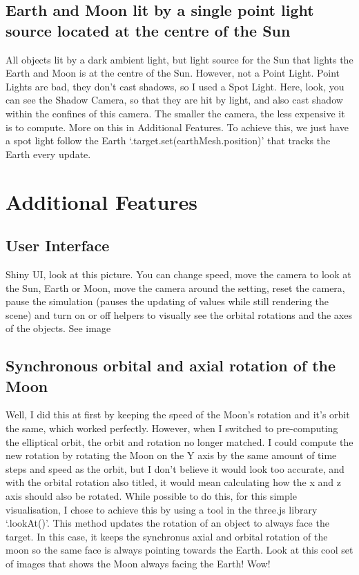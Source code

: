 \documentclass[12pt]{article}
\begin{document}
\subsection{Earth and Moon lit by a single point light source located at the centre of the Sun}
All objects lit by a dark ambient light, but light source for the Sun that lights the Earth and Moon is at the centre of the Sun. However, not a Point Light. Point Lights are bad, they don't cast shadows, so I used a Spot Light. Here, look, you can see the Shadow Camera, so that they are hit by light, and also cast shadow within the confines of this camera. The smaller the camera, the less expensive it is to compute. More on this in Additional Features. To achieve this, we just have a spot light follow the Earth `.target.set(earthMesh.position)' that tracks the Earth every update.



\section{Additional Features}
\subsection{User Interface}
Shiny UI, look at this picture. You can change speed, move the camera to look at the Sun, Earth or Moon, move the camera around the setting, reset the camera, pause the simulation (pauses the updating of values while still rendering the scene) and turn on or off helpers to visually see the orbital rotations and the axes of the objects. See image

\subsection{Synchronous orbital and axial rotation of the Moon}
Well, I did this at first by keeping the speed of the Moon's rotation and it's orbit the same, which worked perfectly. However, when I switched to pre-computing the elliptical orbit, the orbit and rotation no longer matched. I could compute the new rotation by rotating the Moon on the Y axis by the same amount of time steps and speed as the orbit, but I don't believe it would look too accurate, and with the orbital rotation also titled, it would mean calculating how the x and z axis should also be rotated. While possible to do this, for this simple visualisation, I chose to achieve this by using a tool in the three.js library `.lookAt()'. This method updates the rotation of an object to always face the target. In this case, it keeps the synchronus axial and orbital rotation of the moon so the same face is always pointing towards the Earth. Look at this cool set of images that shows the Moon always facing the Earth! Wow!
\end{document}
